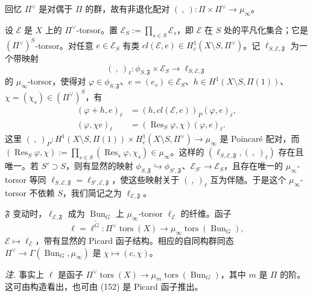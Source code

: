 
 回忆 $\Pi^{\vee}$ 是对偶于 $\Pi$ 的群，故有非退化配对 $(\ ,\ ):\Pi\times\Pi^{\vee}\to\mu_\infty$。

设 $\mathcal{E}$ 是 $X$ 上的 $\Pi^{\vee}$-torsor。置 $\mathcal{E}_S:=\prod_{s\in S}\mathcal{E}_s$，即 $\mathcal{E}$ 在 $S$ 处的平凡化集合；它是 $(\Pi^{\vee})^S$-torsor。对任意 $e\in\mathcal{E}_S$ 有类 $cl(\mathcal{E},e)\in H^1_c(X\setminus S,\Pi^{\vee})$。记 $\ell_{S,\mathcal{E},\mathfrak{F}}$ 为一个带映射
\begin{equation}\tag{150}
(\ ,\ )_{\ell}:\phi_{S,\mathfrak{F}}\times\mathcal{E}_S\to\ell_{S,\mathcal{E},\mathfrak{F}}
\end{equation}
的 $\mu_\infty$-torsor，使得对 $\varphi\in\phi_{S,\mathfrak{F}}$、$e=(e_s)\in\mathcal{E}_S$、$h\in H^1(X\setminus S,\Pi(1))$、$\chi=(\chi_s)\in(\Pi^{\vee})^S$，有
\begin{equation}\tag{151}
\begin{aligned}
(\varphi+h,e)_{\ell}&=(h,cl(\mathcal{E},e))_P(\varphi,e)_{\ell},\\
(\varphi,\chi e)_{\ell}&=(\operatorname{Res}_S\varphi,\chi)(\varphi,e)_{\ell}.
\end{aligned}
\end{equation}
这里 $(\ ,\ )_P:H^1(X\setminus S,\Pi(1))\times H^1_c(X\setminus S,\Pi^{\vee})\to\mu_\infty$ 是 Poincaré 配对，而 $(\operatorname{Res}_S\varphi,\chi):=\prod_{s\in S}(\operatorname{Res}_s\varphi,\chi_s)\in\mu_\infty$。这样的 $(\ell_{S,\mathcal{E},\mathfrak{F}},(\ ,\ )_{\ell})$ 存在且唯一。若 $S'\supset S$，则有显然的映射 $\phi_{S,\mathfrak{F}}\hookrightarrow\phi_{S',\mathfrak{F}}$、$\mathcal{E}_{S'}\to\mathcal{E}_S$，且存在唯一的 $\mu_\infty$-torsor 等同 $\ell_{S,\mathcal{E},\mathfrak{F}}=\ell_{S',\mathcal{E},\mathfrak{F}}$，使这些映射关于 $(\ ,\ )_{\ell}$ 互为伴随。于是这个 $\mu_\infty$-torsor 不依赖 $S$，我们简记之为 $\ell_{\mathcal{E},\mathfrak{F}}$。

$\mathfrak{F}$ 变动时，$\ell_{\mathcal{E},\mathfrak{F}}$ 成为 $\operatorname{Bun}_G$ 上 $\mu_\infty$-torsor $\ell_{\mathcal{E}}$ 的纤维。函子
\begin{equation}\tag{152}
\ell=\ell^{\tilde G}:\Pi^{\vee}\operatorname{tors}(X)\to\mu_\infty\operatorname{tors}(\operatorname{Bun}_G),
\end{equation}
$\mathcal{E}\mapsto\ell_{\mathcal{E}}$，带有显然的 Picard 函子结构。相应的自同构群同态 $\Pi^{\vee}\to\Gamma(\operatorname{Bun}_G,\mu_\infty)$ 是 $\chi\mapsto(c,\chi)$。

\emph{注.} 事实上 $\ell$ 是函子 $\Pi^{\vee}\operatorname{tors}(X)\to\mu_m\operatorname{tors}(\operatorname{Bun}_G)$，其中 $m$ 是 $\Pi$ 的阶。这可由构造看出，也可由 (152) 是 Picard 函子推出。

